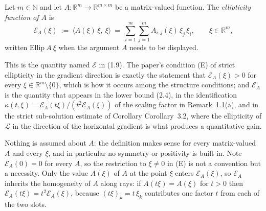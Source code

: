 \begin{definition}
Let $m\in\mathbb N$ and let $A:\mathbb R^m\to\mathbb R^{m\times m}$ be a matrix-valued
function. The \emph{ellipticity function of $A$} is
\[
 \mathcal E_A(\xi)\ :=\ \langle A(\xi)\,\xi,\ \xi\rangle
   \ =\ \sum_{i=1}^{m}\sum_{j=1}^{m} A_{i,j}(\xi)\,\xi_j\,\xi_i ,
 \qquad \xi\in\mathbb R^{m},
\]
written $\mathrm{Ellip}\ A\ \xi$ when the argument $A$ needs to be displayed.

This is the quantity named $\mathcal E$ in (1.9). The paper's condition (E) of strict
ellipticity in the gradient direction is exactly the statement that
$\mathcal E_A(\xi)>0$ for every $\xi\in\mathbb R^{m}\setminus\{0\}$, which is how it occurs
among the structure conditions; and $\mathcal E_A$ is the quantity that appears in the lower
bound (2.4), in the identification $\kappa(t,\xi)=\mathcal E_A(t\xi)/(t^{2}\mathcal E_A(\xi))$
of the scaling factor in Remark~1.1(a), and in the strict sub-solution estimate of
Corollary Corollary~3.2, where the ellipticity of $\mathcal L$ in the direction of the
horizontal gradient is what produces a quantitative gain.

Nothing is assumed about $A$: the definition makes sense for every matrix-valued $A$ and
every $\xi$, and in particular no symmetry or positivity is built in. Note
$\mathcal E_A(0)=0$ for every $A$, so the restriction to $\xi\neq0$ in (E) is not a
convention but a necessity. Only the value $A(\xi)$ of $A$ at the point $\xi$ enters
$\mathcal E_A(\xi)$, so $\mathcal E_A$ inherits the homogeneity of $A$ along rays: if
$A(t\xi)=A(\xi)$ for $t>0$ then $\mathcal E_A(t\xi)=t^{2}\mathcal E_A(\xi)$, because
$(t\xi)_k=t\,\xi_k$ contributes one factor $t$ from each of the two slots.
\end{definition}
